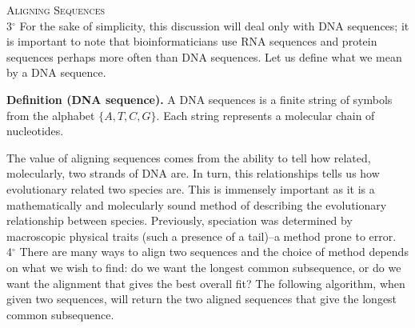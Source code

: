 \documentclass[a4paper]{article}
\begin{document}
\textsc{Aligning Sequences} \\

3$^\circ$ For the sake of simplicity, this discussion will deal only with DNA sequences; it is important to note that bioinformaticians use RNA sequences and protein sequences perhaps more often than DNA sequences. Let us define what we mean by a DNA sequence. \\

\begin{adjustwidth}{.5in}{0pt}
\textbf{Definition (DNA sequence).} A DNA sequences is a finite string of symbols from the alphabet $\{A,T,C,G\}$. Each string represents a molecular chain of nucleotides. \\
\end{adjustwidth}

The value of aligning sequences comes from the ability to tell how related, molecularly, two strands of DNA are. In turn, this relationships tells us how evolutionary related two species are. This is immensely important as it is a mathematically and molecularly sound method of describing the evolutionary relationship between species. Previously, speciation was determined by macroscopic physical traits (such a presence of a tail)--a method prone to error. \\

4$^\circ$ There are many ways to align two sequences and the choice of method depends on what we wish to find: do we want the longest common subsequence, or do we want the alignment that gives the best overall fit? The following algorithm, when given two sequences, will return the two aligned sequences that give the longest common subsequence. \\
\end{document}
